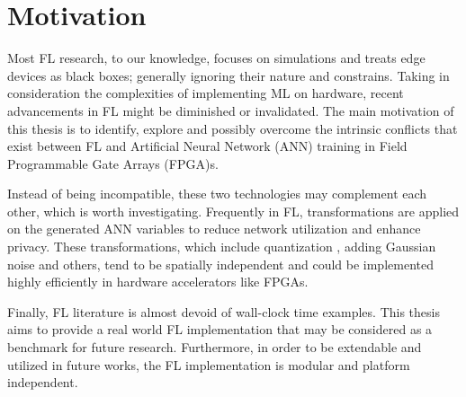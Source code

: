 \section{Motivation}
Most FL research, to our knowledge, focuses on simulations and treats edge devices as black boxes; generally ignoring their nature and constrains. Taking in consideration the complexities of implementing ML on hardware, recent advancements in FL might be diminished or invalidated. The main motivation of this thesis is to identify, explore and possibly overcome the intrinsic conflicts that exist between FL and Artificial Neural Network (ANN) training in Field Programmable Gate Arrays (FPGA)s. %

Instead of being incompatible, these two technologies may complement each other, which is worth investigating. Frequently in FL, transformations are applied on the generated ANN variables to reduce network utilization and enhance privacy. These transformations, which include quantization \cite{Mills2020}, adding Gaussian noise \cite{Wei2020} and others, tend to be spatially independent and could be implemented highly efficiently in hardware accelerators like FPGAs.

Finally, FL literature is almost devoid of wall-clock time examples. This thesis aims to provide a real world FL implementation that may be considered as a benchmark for future research. Furthermore, in order to be extendable and utilized in future works, the FL implementation is modular and platform independent.

